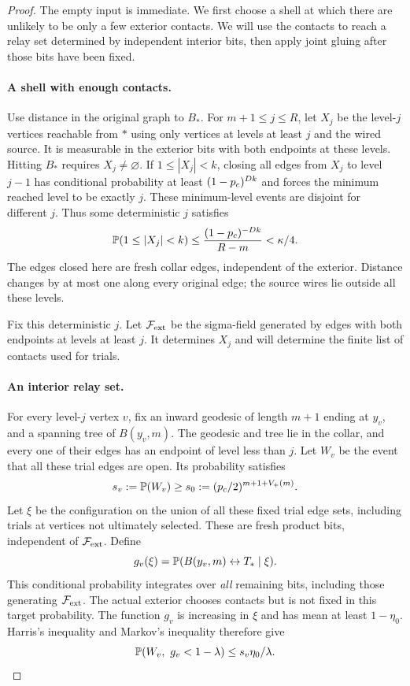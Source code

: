 \begin{proof}
The empty input is immediate. We first choose a shell at which there
are unlikely to be only a few exterior contacts. We will use the
contacts to reach a relay set determined by independent interior bits,
then apply joint gluing after those bits have been fixed.

\paragraph{A shell with enough contacts.}
Use distance in the original graph to
$B_*$. For $m+1\le j\le R$, let $X_j$ be the level-$j$ vertices
reachable from $*$ using only vertices at levels at least $j$ and
the wired source. It is measurable in the exterior bits with both
endpoints at these levels. Hitting $B_*$ requires $X_j\ne\varnothing$.
If $1\le|X_j|<k$, closing all edges from $X_j$ to level $j-1$
has conditional probability at least $(1-p_c)^{Dk}$ and forces the
minimum reached level to be exactly $j$. These minimum-level events
are disjoint for different $j$. Thus some deterministic $j$ satisfies
\begin{equation}\label{eq:few-contacts}
 \mathbb P(1\le|X_j|<k)
 \le\frac{(1-p_c)^{-Dk}}{R-m}<\kappa/4.
\end{equation}
The edges closed here are fresh collar edges, independent of the
exterior. Distance changes by at most one along every original edge;
the source wires lie outside all these levels.

Fix this deterministic $j$. Let $\mathcal F_{\rm ext}$ be the
sigma-field generated by edges with both endpoints at levels at least
$j$. It determines $X_j$ and will determine the finite list of contacts
used for trials.

\paragraph{An interior relay set.}
For every level-$j$ vertex $v$, fix an inward geodesic of length
$m+1$ ending at $y_v$, and a spanning tree of $B(y_v,m)$. The geodesic
and tree lie in the collar, and every one of their edges has an
endpoint of level less than $j$. Let $W_v$ be the event that all
these trial edges are open. Its probability satisfies
\[
 s_v:=\mathbb P(W_v)\ge s_0:=(p_c/2)^{m+1+V_+(m)}.
\]
Let $\xi$ be the configuration on the union of all these fixed trial
edge sets, including trials at vertices not ultimately selected.
These are fresh product bits, independent of $\mathcal F_{\rm ext}$.
Define
\[
 g_v(\xi)=\mathbb P(B(y_v,m)\leftrightarrow T_*\mid\xi).
\]
This conditional probability integrates over \emph{all} remaining
bits, including those generating $\mathcal F_{\rm ext}$. The actual
exterior chooses contacts but is not fixed in this target probability.
The function $g_v$ is increasing in $\xi$ and has
mean at least $1-\eta_0$. Harris's inequality and Markov's inequality
therefore give
\begin{equation}\label{eq:good-trial}
 \mathbb P(W_v,\ g_v<1-\lambda)\le s_v\eta_0/\lambda.
\end{equation}


\end{proof}
